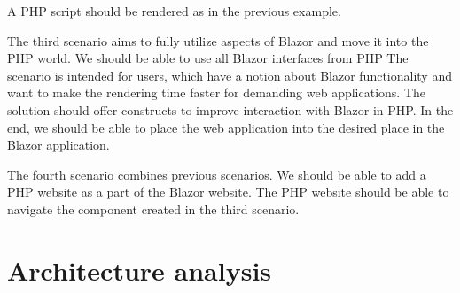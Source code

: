 A PHP script should be rendered as in the previous example.
\par
The third scenario aims to fully utilize aspects of Blazor and move it into the PHP world.
We should be able to use all Blazor interfaces from PHP
The scenario is intended for users, which have a notion about Blazor functionality and want to make the rendering time faster for demanding web applications.
The solution should offer constructs to improve interaction with Blazor in PHP.
In the end, we should be able to place the web application into the desired place in the Blazor application.
\par
The fourth scenario combines previous scenarios.
We should be able to add a PHP website as a part of the Blazor website.
The PHP website should be able to navigate the component created in the third scenario.

\section{Architecture analysis}

